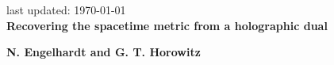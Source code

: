 \documentclass[12pt]{article}
\date{}
\begin{document}
{\Large{}
\hfill{\normalsize last updated: \today}
\\[2mm]
\textbf{Recovering the spacetime metric from a holographic dual\cite{Engelhardt:2016crc}
}
}

\noindent
\hfill
\textbf{N. Engelhardt and G. T. Horowitz}%

\vspace{12pt}


 

\end{document}
